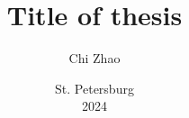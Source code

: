 \documentclass[hidelinks,fontsize=14pt,paper=a4,pagesize,DIV=calc]{gost}
\author{Chi Zhao}
\date{St. Petersburg \\ 2024}
\title{Title of thesis}
\begin{document}
\maketitlepage
\tableofcontents













\end{document}
